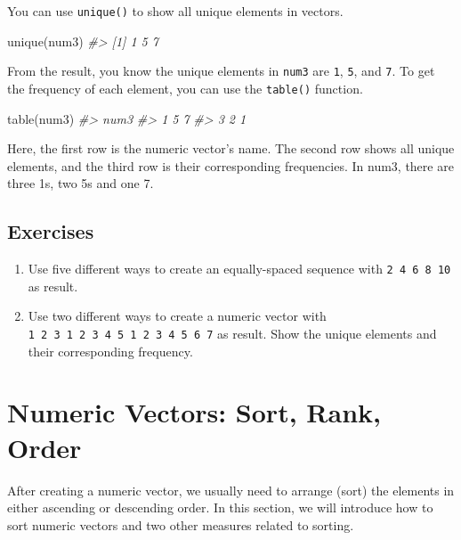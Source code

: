 \documentclass[
]{book}
\newenvironment{Shaded}{\begin{snugshade}}{\end{snugshade}}
\newcommand{\CommentTok}[1]{\textcolor[rgb]{0.56,0.35,0.01}{\textit{#1}}}
\newcommand{\FunctionTok}[1]{\textcolor[rgb]{0.00,0.00,0.00}{#1}}
\newcommand{\NormalTok}[1]{#1}
\begin{document}
You can use \texttt{unique()} to show all unique elements in vectors.

\begin{Shaded}
\begin{Highlighting}[]
\FunctionTok{unique}\NormalTok{(num3)}
\CommentTok{\#\textgreater{} [1] 1 5 7}
\end{Highlighting}
\end{Shaded}

From the result, you know the unique elements in \texttt{num3} are \texttt{1}, \texttt{5}, and \texttt{7}. To get the frequency of each element, you can use the \texttt{table()} function.

\begin{Shaded}
\begin{Highlighting}[]
\FunctionTok{table}\NormalTok{(num3)}
\CommentTok{\#\textgreater{} num3}
\CommentTok{\#\textgreater{} 1 5 7 }
\CommentTok{\#\textgreater{} 3 2 1}
\end{Highlighting}
\end{Shaded}

Here, the first row is the numeric vector's name. The second row shows all unique elements, and the third row is their corresponding frequencies. In num3, there are three 1s, two 5s and one 7.

\hypertarget{exercises-8}{%
\subsection{Exercises}\label{exercises-8}}

\begin{enumerate}
\def\labelenumi{\arabic{enumi}.}
\item
  Use five different ways to create an equally-spaced sequence with \texttt{2\ 4\ 6\ 8\ 10} as result.
\item
  Use two different ways to create a numeric vector with \texttt{1\ 2\ 3\ 1\ 2\ 3\ 4\ 5\ 1\ 2\ 3\ 4\ 5\ 6\ 7} as result. Show the unique elements and their corresponding frequency.
\end{enumerate}

\hypertarget{numeric-sort-rank-order}{%
\section{Numeric Vectors: Sort, Rank, Order}\label{numeric-sort-rank-order}}

After creating a numeric vector, we usually need to arrange (sort) the elements in either ascending or descending order. In this section, we will introduce how to sort numeric vectors and two other measures related to sorting.
\end{document}
